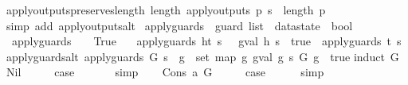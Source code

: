 \begin{isabellebody}
\ apply{\isacharunderscore}outputs{\isacharunderscore}preserves{\isacharunderscore}length{\isacharcolon}\ {\isachardoublequoteopen}length\ {\isacharparenleft}apply{\isacharunderscore}outputs\ p\ s{\isacharparenright}\ {\isacharequal}\ length\ p{\isachardoublequoteclose}\isanewline
%
\isadelimproof
\ \ %
\endisadelimproof
%
\isatagproof
{}\isamarkupfalse%
\ {\isacharparenleft}simp\ add{\isacharcolon}\ apply{\isacharunderscore}outputs{\isacharunderscore}alt{\isacharparenright}%
\endisatagproof
{\isafoldproof}%
%
\isadelimproof
\isanewline
%
\endisadelimproof
\isanewline
{}\isamarkupfalse%
\ apply{\isacharunderscore}guards\ {\isacharcolon}{\isacharcolon}\ {\isachardoublequoteopen}guard\ list\ {\isasymRightarrow}\ datastate\ {\isasymRightarrow}\ bool{\isachardoublequoteclose}\ \isanewline
\ \ {\isachardoublequoteopen}apply{\isacharunderscore}guards\ {\isacharbrackleft}{\isacharbrackright}\ {\isacharunderscore}\ {\isacharequal}\ True{\isachardoublequoteclose}\ {\isacharbar}\isanewline
\ \ {\isachardoublequoteopen}apply{\isacharunderscore}guards\ {\isacharparenleft}h{\isacharhash}t{\isacharparenright}\ s\ {\isacharequal}\ \ {\isacharparenleft}{\isacharparenleft}gval\ h\ s{\isacharparenright}\ {\isacharequal}\ true\ {\isasymand}\ {\isacharparenleft}apply{\isacharunderscore}guards\ t\ s{\isacharparenright}{\isacharparenright}{\isachardoublequoteclose}\isanewline
\isanewline
{}\isamarkupfalse%
\ apply{\isacharunderscore}guards{\isacharunderscore}alt{\isacharcolon}\ {\isachardoublequoteopen}apply{\isacharunderscore}guards\ G\ s\ {\isacharequal}\ {\isacharparenleft}{\isasymforall}g\ {\isasymin}\ set\ {\isacharparenleft}map\ {\isacharparenleft}{\isasymlambda}g{\isachardot}\ gval\ g\ s{\isacharparenright}\ G{\isacharparenright}{\isachardot}\ g\ {\isacharequal}\ true{\isacharparenright}{\isachardoublequoteclose}\isanewline
%
\isadelimproof
%
\endisadelimproof
%
\isatagproof
{}\isamarkupfalse%
{\isacharparenleft}induct\ G{\isacharparenright}\isanewline
{}\isamarkupfalse%
\ Nil\isanewline
\ \ \isamarkupfalse%
\ \isamarkupfalse%
\ {\isacharquery}case\ \isanewline
\ \ \ \ \isamarkupfalse%
\ simp\isanewline
{}\isamarkupfalse%
\isanewline
\ \ \isamarkupfalse%
\ {\isacharparenleft}Cons\ a\ G{\isacharparenright}\isanewline
\ \ \isamarkupfalse%
\ \isamarkupfalse%
\ {\isacharquery}case\isanewline
\ \ \ \ \isamarkupfalse%
\ simp\isanewline
{}\isamarkupfalse%

\end{isabellebody}
